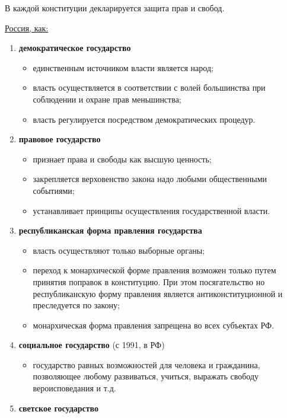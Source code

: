 \documentclass[a5paper,10pt]{article}
\begin{document}
		В каждой конституции декларируется защита прав и свобод.

		\underline{Россия, как:}
		\begin{enumerate}
			\item \textbf{демократическое государство}
				\begin{itemize}[itemsep=0pt]
					\item единственным источником власти является народ;
					\item власть осуществляется в соответствии с волей большинства при соблюдении и охране прав меньшинства;
					\item власть регулируется посредством демократических процедур.
				\end{itemize}

			\item \textbf{правовое государство}
				\begin{itemize}[itemsep=0pt]
					\item признает права и свободы как высшую ценность;
					\item закрепляется верховенство закона надо любыми общественными событиями;
					\item устанавливает принципы осуществления государственной власти.
				\end{itemize}

			\item \textbf{республиканская форма правления государства}
				\begin{itemize}[itemsep=0pt]
					\item власть осуществляют только выборные органы;
					\item переход к монархической форме правления возможен только путем принятия поправок в конституцию. При этом посягательство но республиканскую форму правления является антиконституционной и преследуется по закону;
					\item монархическая форма правления запрещена во всех субъектах РФ.
				\end{itemize}

			\item \textbf{социальное государство} (с 1991, в РФ)
				\begin{itemize}[itemsep=0pt]
					\item государство равных возможностей для человека и гражданина, позволяющее любому развиваться, учиться, выражать свободу вероисповедания и т.д.
				\end{itemize}

			\item \textbf{светское государство}
		\end{enumerate}
\end{document}
